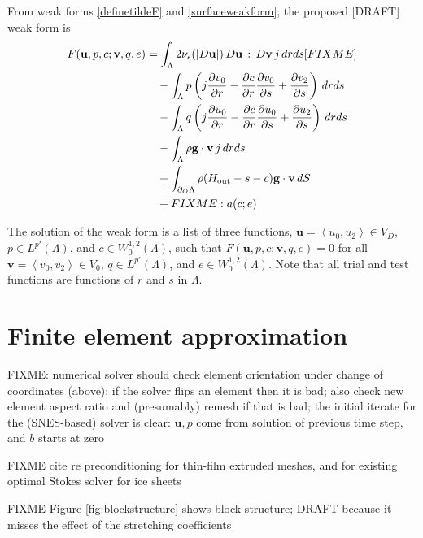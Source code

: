 \documentclass[letterpaper,final,12pt,reqno]{amsart}
\newcommand{\eps}{\epsilon}
\newcommand{\bg}{\mathbf{g}}
\newcommand{\bu}{\mathbf{u}}
\newcommand{\bv}{\mathbf{v}}
\begin{document}
From weak forms \eqref{definetildeF} and \eqref{surfaceweakform}, the proposed [DRAFT] weak form is
\begin{align}
F(\bu,p,c;\bv,q,e) &= \int_\Lambda 2 \nu_\eps(|D\bu|)\, D\bu\,:\,D\bv\, j\,dr ds [FIXME] \label{defineF} \\
    &\quad  - \int_\Lambda p \left(j \frac{\partial v_0}{\partial r} - \frac{\partial c}{\partial r} \frac{\partial v_0}{\partial s} + \frac{\partial v_2}{\partial s}\right) \,dr ds \notag \\
    &\quad - \int_\Lambda q \left(j \frac{\partial u_0}{\partial r} - \frac{\partial c}{\partial r} \frac{\partial u_0}{\partial s} + \frac{\partial u_2}{\partial s}\right)\,dr ds \notag \\
    &\quad  - \int_\Lambda \rho \mathbf{g} \cdot \bv \, j\,dr ds \notag \\
    &\quad + \int_{\partial_O \Lambda} \rho (H_{\text{out}}-s-c) \bg \cdot \bv \,dS \notag \\
    &\quad + FIXME: a(c;e) \notag
\end{align}

The solution of the weak form is a list of three functions, $\bu = \left<u_0,u_2\right> \in V_D$, $p\in L^{p'}(\Lambda)$, and $c\in W^{1,2}_0(\Lambda)$, such that $F(\bu,p,c;\bv,q,e) = 0$ for all $\bv = \left<v_0,v_2\right> \in V_0$,  $q\in L^{p'}(\Lambda)$, and $e \in W^{1,2}_0(\Lambda)$.  Note that all trial and test functions are functions of $r$ and $s$ in $\Lambda$.


\section{Finite element approximation}  \label{sec:finiteelement}

FIXME: numerical solver should check element orientation under change of coordinates (above); if the solver flips an element then it is bad; also check new element aspect ratio and (presumably) remesh if that is bad; the initial iterate for the (SNES-based) solver is clear: $\bu,p$ come from solution of previous time step, and $b$ starts at zero

FIXME cite \cite{Tuminaroetal2016} re preconditioning for thin-film extruded meshes, and \cite{IsaacStadlerGhattas2015} for existing optimal Stokes solver for ice sheets

FIXME Figure \ref{fig:blockstructure} shows block structure; DRAFT because it misses the effect of the stretching coefficients
\end{document}
